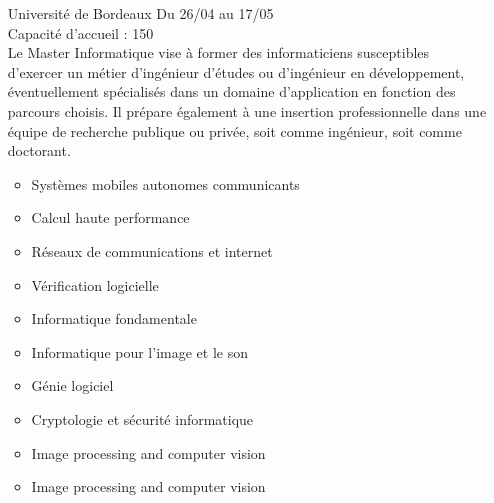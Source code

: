 \documentclass[a4paper,11pt]{article}
\newcommand{\e}{\'{e}}
\begin{document}
\begin{enumerate}
                \\Peut etre deux formation mais difficile a dire il est marquer que la première ferme\dots
                \begin{itemize}
                    \item Ingénierie du Test et de la Validation Logiciels et systèmes
                    \item Ingénierie Systèmes et Logiciels
                \end{itemize}
                $Lien$: \href{http://formation.univ-fcomte.fr/master/informatique-ingenierie-systemes-et-logiciels}{Site Université}
                \\remarque:la premier sp\e \ a l'air sympa dommage qu'elle semble fermer (ou uniquement en distancielle)a $verifier$.
\\
        \item [\color{LightOrangeHaf}Université de Bordeaux] Du 26/04 au 17/05
                \\Capacité d'accueil : 150
                \\Le Master Informatique vise à former des informaticiens susceptibles d'exercer un métier d'ingénieur d'études ou d'ingénieur en développement, éventuellement spécialisés dans un domaine d'application en fonction des parcours choisis. Il prépare également à une insertion professionnelle dans une équipe de recherche publique ou privée, soit comme ingénieur, soit comme doctorant.
                \begin{itemize}
                    \item Systèmes mobiles autonomes communicants
                    \item Calcul haute performance
                    \item Réseaux de communications et internet
                    \item Vérification logicielle
                    \item Informatique fondamentale
                    \item Informatique pour l'image et le son
                    \item Génie logiciel 
                    \item Cryptologie et sécurité informatique
                    \item Image processing and computer vision 
                    \item Image processing and computer vision 
                \end{itemize}

\end{enumerate}
\end{document}
